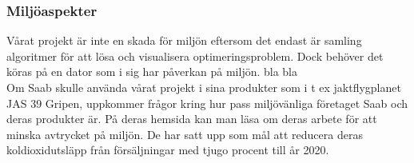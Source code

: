 \subsubsection{Miljöaspekter}
Vårat projekt är inte en skada för miljön eftersom det endast är samling algoritmer för att lösa och visualisera optimeringsproblem. Dock behöver det köras på en dator som i sig har påverkan på miljön. bla bla
\\
Om Saab skulle använda vårat projekt i sina produkter som i t ex jaktflygplanet JAS 39 Gripen, uppkommer frågor kring hur pass miljövänliga företaget Saab och deras produkter är. På deras hemsida \citep{saabimpact} kan man läsa om deras arbete för att minska avtrycket på miljön. De har satt upp som mål att reducera deras koldioxidutsläpp från försäljningar med tjugo procent till år 2020. 